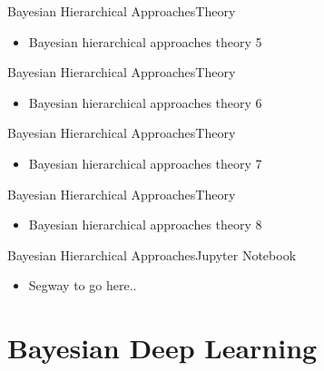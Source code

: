 \documentclass[AERbeamer%
              ,optEnglish%
              ,optBiber%
              ,optBibstyleAlphabetic%
              ,optBeamerClassicFormat%
              ]{AERlatex}%
\begin{document}
\begin{frame}[c]{Bayesian Hierarchical Approaches}{Theory}
    \centering
    \begin{itemize}
        \item Bayesian hierarchical approaches theory 5
    \end{itemize}
\end{frame}


\begin{frame}[c]{Bayesian Hierarchical Approaches}{Theory}
    \centering
    \begin{itemize}
        \item Bayesian hierarchical approaches theory 6
    \end{itemize}
\end{frame}


\begin{frame}[c]{Bayesian Hierarchical Approaches}{Theory}
    \centering
    \begin{itemize}
        \item Bayesian hierarchical approaches theory 7
    \end{itemize}
\end{frame}


\begin{frame}[c]{Bayesian Hierarchical Approaches}{Theory}
    \centering
    \begin{itemize}
        \item Bayesian hierarchical approaches theory 8
    \end{itemize}
\end{frame}


\begin{frame}[c]{Bayesian Hierarchical Approaches}{Jupyter Notebook}
    \centering
    \begin{itemize}
        \item Segway to go here..
    \end{itemize}
\end{frame}



\section{Bayesian Deep Learning}
\end{document}
